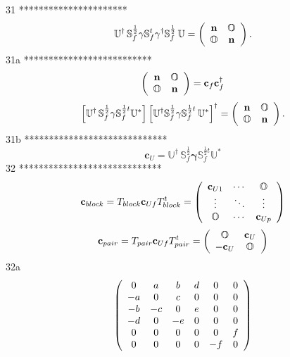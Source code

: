 \documentclass[aps,preprint]{revtex4}%
\begin{document}
31 **********************%
\[
\mathbb{U}^{\dagger}\,\mathbb{S}_{f}^{\frac{1}{2}}\mathbf{\gamma}%
\mathbb{S}_{f}^{t}\mathbf{\gamma}^{\dagger}\mathbb{S}_{f}^{\frac{1}{2}%
}\mathbf{\,}\mathbb{U}=\left(
\begin{array}
[c]{cc}%
\mathbf{n} & \mathbb{O}\\
\mathbb{O} & \mathbf{n}%
\end{array}
\right)  .
\]
31a **************************%
\[
\left(
\begin{array}
[c]{cc}%
\mathbf{n} & \mathbb{O}\\
\mathbb{O} & \mathbf{n}%
\end{array}
\right)  =\mathbf{c}_{f}\mathbf{c}_{f}^{\dagger}%
\]%
\[
\left[  \mathbb{U}^{\dagger}\,\mathbb{S}_{f}^{\frac{1}{2}}\mathbf{\gamma
}\mathbb{S}_{f}^{\frac{1}{2}t}\mathbb{U}^{\ast}\right]  \left[  \mathbb{U}%
^{\dagger}\mathbb{S}_{f}^{\frac{1}{2}}\mathbf{\gamma}\mathbb{S}_{f}^{\frac
{1}{2}t}\mathbf{\,}\mathbb{U}^{\ast}\right]  ^{\dagger}=\left(
\begin{array}
[c]{cc}%
\mathbf{n} & \mathbb{O}\\
\mathbb{O} & \mathbf{n}%
\end{array}
\right)  .
\]
31b *****************************%
\[
\mathbf{c}_{U}=\mathbb{U}^{\dagger}\,\mathbb{S}_{f}^{\frac{1}{2}%
}\mathbf{\gamma}\mathbb{S}_{f}^{\frac{1}{2}t}\mathbb{U}^{\ast}%
\]
32 *****************************%
\[
\mathbf{c}_{block}=T_{block}\mathbf{c}_{Uf}T_{block}^{t}=\left(
\begin{array}
[c]{ccc}%
\mathbf{c}_{U1} & \cdots & \mathbb{O}\\
\vdots & \ddots & \vdots\\
\mathbb{O} & \cdots & \mathbf{c}_{Up}%
\end{array}
\right)
\]%
\[
\mathbf{c}_{pair}=T_{pair}\mathbf{c}_{Uf}T_{pair}^{t}=\left(
\begin{array}
[c]{cc}%
\mathbb{O} & \mathbf{c}_{U}\\
-\mathbf{c}_{U} & \mathbb{O}%
\end{array}
\right)
\]
32a%
\begin{equation}
\left(
\begin{array}
[c]{cccccc}%
0 & a & b & d & 0 & 0\\
-a & 0 & c & 0 & 0 & 0\\
-b & -c & 0 & e & 0 & 0\\
-d & 0 & -e & 0 & 0 & 0\\
0 & 0 & 0 & 0 & 0 & f\\
0 & 0 & 0 & 0 & -f & 0
\end{array}
\right)
\end{equation}%
\end{document}
